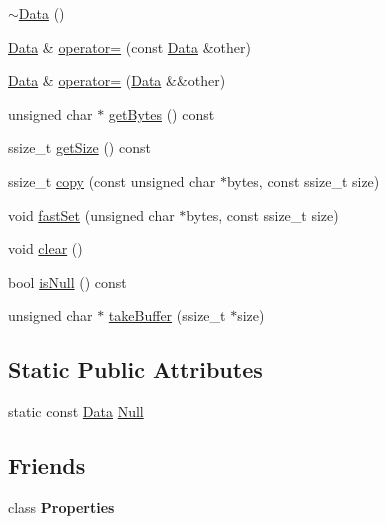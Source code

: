 \begin{DoxyCompactItemize}
\item 
\hyperlink{classData_aab31956423290f0d62dcca47ab4d16dd}{$\sim$\+Data} ()
\item 
\hyperlink{classData}{Data} \& \hyperlink{classData_ad8e70b509933d1594c823ddb69bfaeaa}{operator=} (const \hyperlink{classData}{Data} \&other)
\item 
\hyperlink{classData}{Data} \& \hyperlink{classData_af4f6ef886b01c278efedd31b0165e463}{operator=} (\hyperlink{classData}{Data} \&\&other)
\item 
unsigned char $\ast$ \hyperlink{classData_a34c414f43011e51e3dfb116d7c5ea7fb}{get\+Bytes} () const
\item 
ssize\+\_\+t \hyperlink{classData_adb810cfcdcb6c3da22ac05a4c023445d}{get\+Size} () const
\item 
ssize\+\_\+t \hyperlink{classData_a11d09c86fa7696d0cd89c0fe08970bf8}{copy} (const unsigned char $\ast$bytes, const ssize\+\_\+t size)
\item 
void \hyperlink{classData_ad679f9c8cdff29d6a18c56fa9b70064a}{fast\+Set} (unsigned char $\ast$bytes, const ssize\+\_\+t size)
\item 
void \hyperlink{classData_a44b749f64ffa35e034f9503fdec4917e}{clear} ()
\item 
bool \hyperlink{classData_af0c867ee0a1b0916ce50e9966cd252ef}{is\+Null} () const
\item 
unsigned char $\ast$ \hyperlink{classData_a3fe0976fa60f3bd9fe9f4f7ab40574e4}{take\+Buffer} (ssize\+\_\+t $\ast$size)
\end{DoxyCompactItemize}
\subsection*{Static Public Attributes}
\begin{DoxyCompactItemize}
\item 
static const \hyperlink{classData}{Data} \hyperlink{classData_a4a1177cbbd51dad568fd641a5c173711}{Null}
\end{DoxyCompactItemize}
\subsection*{Friends}
\begin{DoxyCompactItemize}
\item 
\mbox{\label{classData_a85b0a3c65ef994ac751bab62876cfedf}} 
class {\bfseries Properties}
\end{DoxyCompactItemize}


